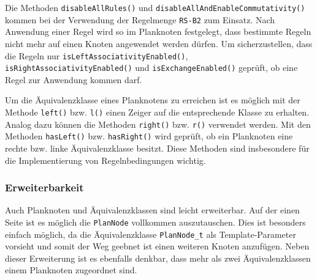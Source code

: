 Die Methoden \texttt{disable\-All\-Rules()} und \texttt{disable\-All\-And\-Enable\-Commutativity()} kommen bei der Verwendung der Regelmenge \texttt{RS-B2} zum Einsatz. Nach Anwendung einer Regel wird so im Planknoten festgelegt, dass bestimmte Regeln nicht mehr auf einen Knoten angewendet werden dürfen. Um sicherzustellen, dass die Regeln nur \texttt{is\-Left\-Associativity\-Enabled()}, \texttt{is\-Right\-Associativity\-Enabled()} und \texttt{is\-Exchange\-Enabled()} geprüft, ob eine Regel zur Anwendung kommen darf.

Um die Äquivalenzklasse eines Planknotens zu erreichen ist es möglich mit der Methode \texttt{left()} bzw. \texttt{l()} einen Zeiger auf die entsprechende Klasse zu erhalten. Analog dazu können die Methoden \texttt{right()} bzw. \texttt{r()} verwendet werden. Mit den Methoden \texttt{has\-Left()} bzw. \texttt{has\-Right()} wird geprüft, ob ein Planknoten eine rechte bzw. linke Äquivalenzklasse besitzt. Diese Methoden sind insbesondere für die Implementierung von Regelnbedingungen wichtig.


\subsubsection{Erweiterbarkeit}

Auch Planknoten und Äquivalenzklassen sind leicht erweiterbar. Auf der einen Seite ist es möglich die \texttt{Plan\-Node} vollkommen auszutauschen. Dies ist besonders einfach möglich, da die Äquivalenzklasse \texttt{PlanNode\_t} als Template-Parameter vorsieht und somit der Weg geebnet ist einen weiteren Knoten anzufügen. Neben dieser Erweiterung ist es ebenfalls denkbar, dass mehr als zwei Äquivalenzklassen einem Planknoten zugeordnet sind. 